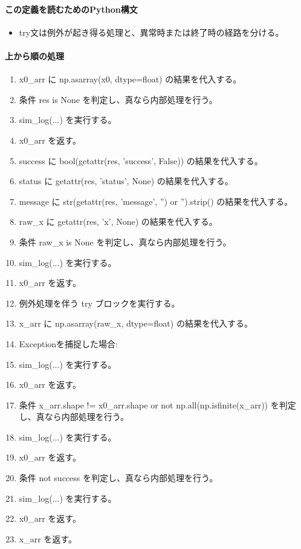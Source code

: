 \documentclass[a4paper,11pt]{article}
\begin{document}
            \paragraph{この定義を読むためのPython構文}
            \begin{itemize}[leftmargin=1.6em]
            \item try文は例外が起き得る処理と、異常時または終了時の経路を分ける。
            \end{itemize}
            \paragraph{上から順の処理}
            \begin{enumerate}[leftmargin=1.8em]
            \item x0\_arr に np.asarray(x0, dtype=float) の結果を代入する。
\item 条件 res is None を判定し、真なら内部処理を行う。
\item   sim\_log(...) を実行する。
\item   x0\_arr を返す。
\item success に bool(getattr(res, 'success', False)) の結果を代入する。
\item status に getattr(res, 'status', None) の結果を代入する。
\item message に str(getattr(res, 'message', '') or '').strip() の結果を代入する。
\item raw\_x に getattr(res, 'x', None) の結果を代入する。
\item 条件 raw\_x is None を判定し、真なら内部処理を行う。
\item   sim\_log(...) を実行する。
\item   x0\_arr を返す。
\item 例外処理を伴う try ブロックを実行する。
\item   x\_arr に np.asarray(raw\_x, dtype=float) の結果を代入する。
\item   Exceptionを捕捉した場合:
\item   sim\_log(...) を実行する。
\item   x0\_arr を返す。
\item 条件 x\_arr.shape != x0\_arr.shape or not np.all(np.isfinite(x\_arr)) を判定し、真なら内部処理を行う。
\item   sim\_log(...) を実行する。
\item   x0\_arr を返す。
\item 条件 not success を判定し、真なら内部処理を行う。
\item   sim\_log(...) を実行する。
\item   x0\_arr を返す。
\item x\_arr を返す。
            \end{enumerate}
\end{document}
